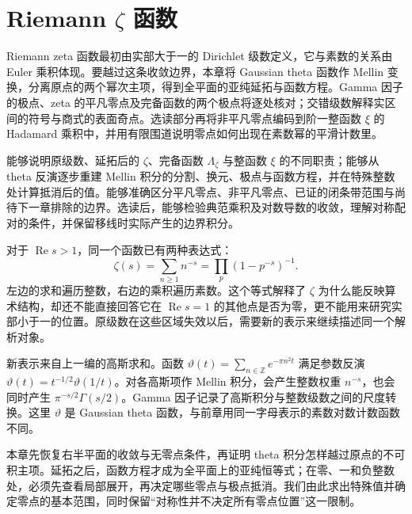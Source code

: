 \chapter{Riemann \texorpdfstring{\(\zeta\)}{\AnalysisPdfZeta} 函数}
\label{b3:ch:26}

\begin{chapterabstract}
Riemann zeta 函数最初由实部大于一的 Dirichlet 级数定义，它与素数的关系由 Euler 乘积体现。要越过这条收敛边界，本章将 Gaussian theta 函数作 Mellin 变换，分离原点的两个幂次主项，得到全平面的亚纯延拓与函数方程。Gamma 因子的极点、zeta 的平凡零点及完备函数的两个极点将逐处核对；交错级数解释实区间的符号与商式的表面奇点。选读部分再将非平凡零点编码到阶一整函数 \(\xi\) 的 Hadamard 乘积中，并用有限围道说明零点如何出现在素数幂的平滑计数里。
\end{chapterabstract}

\begin{learninggoals}
能够说明原级数、延拓后的 \(\zeta\)、完备函数 \(\Lambda_\zeta\) 与整函数 \(\xi\) 的不同职责；能够从 theta 反演逐步重建 Mellin 积分的分割、换元、极点与函数方程，并在特殊整数处计算抵消后的值。能够准确区分平凡零点、非平凡零点、已证的闭条带范围与尚待下一章排除的边界。选读后，能够检验典范乘积及对数导数的收敛，理解对称配对的条件，并保留移线时实际产生的边界积分。
\end{learninggoals}

对于 \(\operatorname{Re}s>1\)，同一个函数已有两种表达式：
\[
 \zeta(s)=\sum_{n\ge1}n^{-s}
         =\prod_p(1-p^{-s})^{-1}.
\]
左边的求和遍历整数，右边的乘积遍历素数。这个等式解释了 \(\zeta\) 为什么能反映算术结构，却还不能直接回答它在 \(\operatorname{Re}s=1\) 的其他点是否为零，更不能用来研究实部小于一的位置。原级数在这些区域失效以后，需要新的表示来继续描述同一个解析对象。

新表示来自上一编的高斯求和。函数
\(\vartheta(t)=\sum_{n\in\mathbb Z}e^{-\pi n^2t}\) 满足参数反演
\(\vartheta(t)=t^{-1/2}\vartheta(1/t)\)。对各高斯项作 Mellin 积分，会产生整数权重 \(n^{-s}\)，也会同时产生 \(\pi^{-s/2}\Gamma(s/2)\)。Gamma 因子记录了高斯积分与整数级数之间的尺度转换。这里 \(\vartheta\) 是 Gaussian theta 函数，与前章用同一字母表示的素数对数计数函数不同。

本章先恢复右半平面的收敛与无零点条件，再证明 theta 积分怎样越过原点的不可积主项。延拓之后，函数方程才成为全平面上的亚纯恒等式；在零、一和负整数处，必须先查看局部展开，再决定哪些零点与极点抵消。我们由此求出特殊值并确定零点的基本范围，同时保留“对称性并不决定所有零点位置”这一限制。

